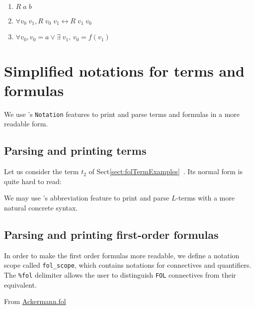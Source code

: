 \label{fol:examplesf1f2f3}
\begin{enumerate}
\item $R\;a\;b$
\item $\forall v_0\; v_1, R\;v_0\;v_1 \leftrightarrow R\;v_1\;v_0$
\item $ \forall v_0, v_0=a \vee \exists\;v_1,\, v_0= f(v_1)$
\end{enumerate}




\section{Simplified notations for terms and formulas}
\label{sect:fol-notations}



 We use \coq's \texttt{Notation} features to print and parse terms and formulas  in a more readable form.

 \subsection{Parsing and printing terms}
 \label{sec:fol-term-notations}

Let us consider the term $t_2$ of Sect\ref{sect:folTermExamples}~. Its normal form is quite hard to read:


We may use \coq's abbreviation feature  to print and parse $L$-terms with a more natural concrete syntax.






\subsection{Parsing and printing first-order formulas}

In order to make the first order formulas more readable, we define  a  notation scope called \texttt{fol\_scope}, which contains 
notations for connectives and quantifiers. The \texttt{\%fol} delimiter 
allows the user to distinguish \texttt{FOL} connectives from their \coq equivalent.


\vspace{6pt}

\noindent From \href{../theories/html/hydras.Ackermann.fol.html}{Ackermann.fol}

